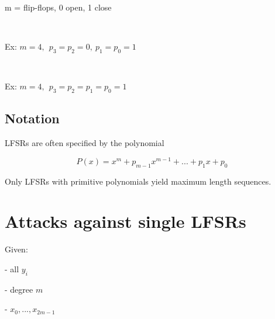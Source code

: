\documentclass[a4paper]{article}
\begin{document}
\

\noindent{}


m = flip-flops, 0 open, 1 close

\

Ex: $m =4, \ \ p_3=p_2=0,\ p_1=p_0 = 1$


\

Ex: $m =4, \ \ p_3=p_2=p_1=p_0 = 1$


\subsection{Notation}

LFSRs are often specified by the polynomial

$$P(x) = x^m + p_{m-1} x^{m-1} + ... + p_1 x + p_0$$

Only LFSRs with primitive polynomials yield maximum length sequences.



\section{Attacks against single LFSRs}


Given:

    - all $y_i$

    - degree $m$

    - $x_0,...,x_{2m-1}$
\end{document}

